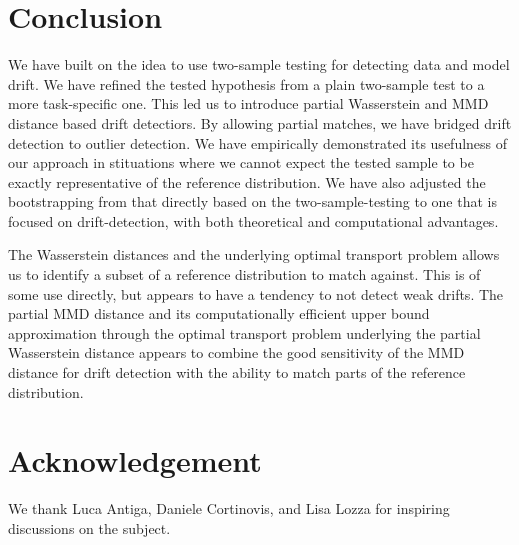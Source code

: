 \documentclass[a4paper,twoside,10pt]{article}
\theoremstyle{plain}
\theoremstyle{remark}
\begin{document}
\section{Conclusion}

We have built on the idea to use two-sample testing for detecting data and model drift. We have refined the tested hypothesis from a plain two-sample test to a more task-specific one.
This led us to introduce partial Wasserstein and MMD distance based drift detectiors. By allowing partial matches, we have bridged drift detection to outlier detection.
We have empirically demonstrated its usefulness of our approach in stituations where we cannot expect the tested sample to be exactly representative of the reference distribution.
We have also adjusted the bootstrapping from that directly based on the two-sample-testing to one that is focused on drift-detection, with both theoretical and computational advantages.

The Wasserstein distances and the underlying optimal transport problem allows us to identify a subset of a reference distribution to match against. This is of some use directly, but appears to have a tendency
to not detect weak drifts.
The partial MMD distance and its computationally efficient upper bound approximation through the optimal transport problem underlying the partial Wasserstein distance appears to combine the good sensitivity of the MMD distance for drift detection with the ability to match parts of the reference distribution.

\section{Acknowledgement}

We thank Luca Antiga, Daniele Cortinovis, and Lisa Lozza for inspiring discussions on the subject.
\end{document}
